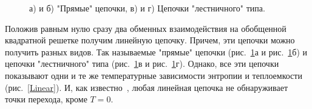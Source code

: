 \documentclass[utf8,12pt]{jetp}
\begin{document}
\begin{figure}[h]
\begin{minipage}{0.45\linewidth}
	\end{minipage}
	\hfill
	\begin{minipage}{0.45\linewidth}
	\end{minipage}
	\caption{а) и б) "Прямые" цепочки, в) и г) Цепочки "лестничного" типа.}
	\label{linearChains}
\end{figure}

Положив равным нулю сразу два обменных взаимодействия на обобщенной квадратной решетке получим линейную цепочку. Причем, эти цепочки можно получить разных видов. Так называемые "прямые" цепочки (рис.~\ref{linearChains}а и рис.~\ref{linearChains}б) и цепочки "лестничного" типа (рис.~\ref{linearChains}в и рис.~\ref{linearChains}г). Однако, все эти цепочки показывают одни и те же температурные зависимости энтропии и теплоемкости (рис.~\ref{Linear}). И, как известно~\cite{mussardo2010}, любая линейная цепочка не обнаруживает точки перехода, кроме $T=0$.
\end{document}

